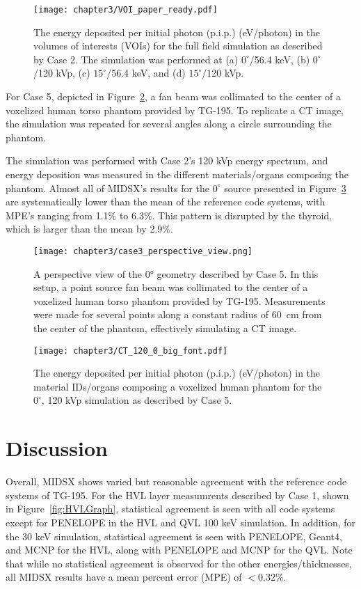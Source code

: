 \begin{figure}[H]
    \centering
	\texttt{[image: chapter3/VOI\_paper\_ready.pdf]}
	\caption{The energy deposited per initial photon (p.i.p.) (eV/photon) in the volumes of interests (VOIs) for the full field simulation as described by Case 2. The simulation was performed at (a) $0^\circ$/56.4 keV, (b) $0^\circ$/120 kVp, (c) $15^\circ$/56.4 keV, and (d) $15^\circ$/120 kVp.}
	\label{fig:VOIFFGraph}
\end{figure}

\par For Case 5, depicted in Figure~\ref{fig:case3}, a fan beam was collimated to the center of a\linebreak
voxelized human torso phantom provided by TG-195. To replicate a CT image, the simulation was repeated for several angles along a circle surrounding the phantom. 
\par The simulation was performed with Case 2's 120 kVp energy spectrum, and energy deposition was measured in the different materials/organs composing the phantom. Almost all of MIDSX's results for the $0^\circ$ source presented in Figure~\ref{fig:CTGraph} are systematically lower than the mean of the reference code systems, with MPE's ranging from 1.1\% to 6.3\%. This pattern is disrupted by the thyroid, which is larger than the mean by 2.9\%. 

\begin{figure}[H]
    \centering
    \texttt{[image: chapter3/case3\_perspective\_view.png]}
    \caption{A perspective view of the \ang{0} geometry described by Case 5. In this setup, a point source fan beam was collimated to the center of a voxelized human torso phantom provided by TG-195. Measurements were made for several points along a constant radius of \qty{60}{cm} from the center of the phantom, effectively simulating a CT image.}
    \label{fig:case3}
\end{figure}

\begin{figure}[H]
    \centering
	\texttt{[image: chapter3/CT\_120\_0\_big\_font.pdf]}
	\caption{The energy deposited per initial photon (p.i.p.) (eV/photon) in the material IDs/organs composing a voxelized human phantom for the $0^\circ$, 120 kVp simulation as described by Case 5.}
	\label{fig:CTGraph}
\end{figure}

\newpage
\section{Discussion}
\par Overall, MIDSX shows varied but reasonable agreement with the reference code systems of TG-195. For the HVL layer measumrents described by Case 1, shown in Figure~\ref{fig:HVLGraph}, statistical agreement is seen with all code systems except for PENELOPE in the HVL and QVL 100 keV simulation. In addition, for the 30 keV simulation, statistical agreement is seen with PENELOPE, Geant4, and MCNP for the HVL, along with PENELOPE and MCNP for the QVL. Note that while no statistical agreement is observed for the other energies/thicknesses, all MIDSX results have a mean percent error (MPE) of $<0.32$\%.

